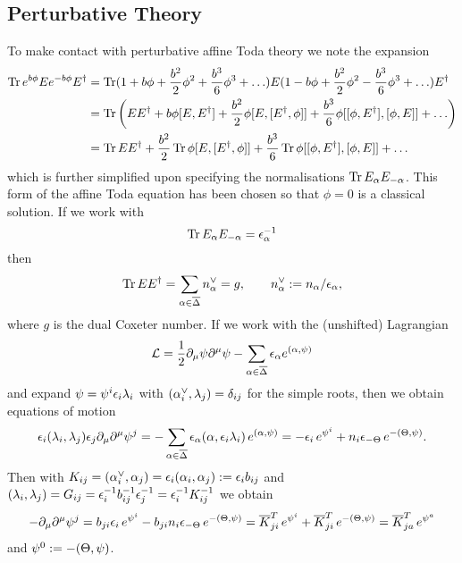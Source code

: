 \documentclass{article}
\begin{document}
\subsection{Perturbative Theory}
To make contact with perturbative affine Toda theory we note the expansion
\begin{align*}
\tr e^{b\phi}E  e^{-b\phi} E\sp\dagger&=\tr
(1+b\phi+\frac{b^2}{2}\phi^2+\frac{b^3}{6}\phi^3+\ldots) E
(1-b\phi+\frac{b^2}{2}\phi^2-\frac{b^3}{6}\phi^3+\ldots) 
E\sp\dagger\\
&=\tr \left(E E\sp\dagger+b\phi[E,E\sp\dagger]+\frac{b^2}{2}\phi[ E,[ E\sp\dagger, \phi]]+
\frac{b^3}{6}\phi[ [\phi, E\sp\dagger], [\phi,E]]
+ \ldots
\right)\\
&= \tr E E\sp\dagger+\frac{b^2}{2}\tr \phi[ E,[ E\sp\dagger, \phi]]+ \frac{b^3}{6}\tr \phi[ [\phi, E\sp\dagger], [\phi,E]]+\ldots
\end{align*}
which is further simplified upon specifying the normalisations $ \tr E_\alpha E_{-\alpha}$. This form of the
affine Toda equation has been chosen so that $\phi=0$ is a classical solution. If we work with
$$\tr E_\alpha E_{-\alpha}=\epsilon_\alpha^{-1}
$$
then
$$ \tr E E\sp\dagger=\sum_{\alpha\in\bar\Delta}n_\alpha\sp\vee =g,\qquad  n_\alpha\sp\vee :=
n_\alpha/\epsilon_\alpha,$$
where $g$ is the dual Coxeter number. If we work with the (unshifted) Lagrangian
$$
\mathcal{L}= \frac12 \partial_\mu\psi \partial\sp\mu\psi -
\sum_{\alpha\in\bar\Delta}\epsilon_\alpha e\sp{(\alpha,\psi)}
$$
and expand $\psi=\psi\sp{i}\epsilon_i\lambda_i$ with $(\alpha_i\sp\vee,\lambda_j)=\delta_{ij}$ for the simple roots, then we obtain equations of motion
$$\epsilon_i(\lambda_i,\lambda_j)\epsilon_j \partial_\mu\partial\sp\mu\psi\sp{j}=-
\sum_{\alpha\in\bar\Delta}\epsilon_\alpha (\alpha, \epsilon_i\lambda_i)\, e\sp{(\alpha,\psi)}
= -\epsilon_i\, e\sp{\psi\sp{i}}+n_i \epsilon_{-\Theta }\,e\sp{-(\Theta,\psi)}.
$$
Then with $K_{ij}=(\alpha_i\sp{\vee},\alpha_j)=\epsilon_i (\alpha_i,\alpha_j):=\epsilon_i b_{ij}$ and
$(\lambda_i,\lambda_j)=G_{ij}=\epsilon_i\sp{-1}b_{ij}\sp{-1}\epsilon_j\sp{-1}=\epsilon_i\sp{-1}K_{ij}\sp{-1}$ we obtain
$$-\partial_\mu\partial\sp\mu\psi\sp{j}=b_{ji}\epsilon_i\, e\sp{\psi\sp{i}}-b_{ji}n_i \epsilon_{-\Theta }\,e\sp{-(\Theta,\psi)}
={\bar K}_{ji}\sp{T}\, e\sp{\psi\sp{i}}+{\bar K}_{ji}\sp{T}\, e\sp{-(\Theta,\psi)}
={\bar K}_{ja}\sp{T}\, e\sp{\psi\sp{a}}
$$
and $\psi\sp0:=-(\Theta,\psi)$.


\end{document}
